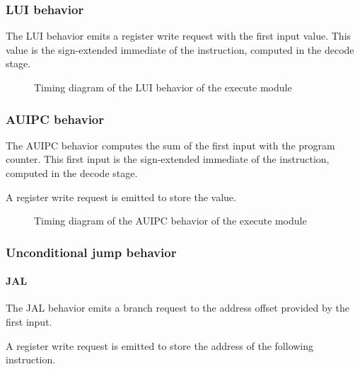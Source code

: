     \subsubsection{LUI behavior}

      \begin{content}
          The LUI behavior emits a register write request with the first input value. This value is the sign-extended immediate of the instruction, computed in the decode stage.
        \end{content}

      \begin{figure}[H]
          \centering
          
          \caption{Timing diagram of the LUI behavior of the execute module}
          \label{fig:exm-behavior-lui}
        \end{figure}

    \subsubsection{AUIPC behavior}

      \begin{content}
          The AUIPC behavior computes the sum of the first input with the program counter. This first input is the sign-extended immediate of the instruction, computed in the decode stage.
          
          A register write request is emitted to store the value.
        \end{content}

      \begin{figure}[H]
          \centering
          
          \caption{Timing diagram of the AUIPC behavior of the execute module}
          \label{fig:exm-behavior-auipc}
        \end{figure}

    \subsubsection{Unconditional jump behavior}

      \paragraph{JAL}

      \begin{content}
          The JAL behavior emits a branch request to the address offset provided by the first input.
          
          A register write request is emitted to store the address of the following instruction.
        \end{content}

